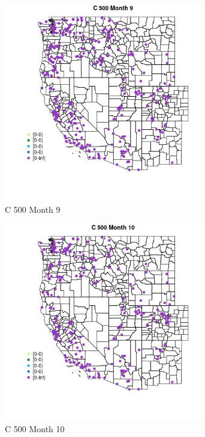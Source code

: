 \begin{figure} 
\centering  
\includegraphics[width=0.77\textwidth]{Code_Outputs/Report_ML_input_PM25_Step4_part_e_de_duplicated_aveswNAs_MapObsMo9C_500.jpg} 
\caption{\label{fig:Report_ML_input_PM25_Step4_part_e_de_duplicated_aveswNAsMapObsMo9C_500}C 500 Month 9} 
\end{figure} 
 

\begin{figure} 
\centering  
\includegraphics[width=0.77\textwidth]{Code_Outputs/Report_ML_input_PM25_Step4_part_e_de_duplicated_aveswNAs_MapObsMo10C_500.jpg} 
\caption{\label{fig:Report_ML_input_PM25_Step4_part_e_de_duplicated_aveswNAsMapObsMo10C_500}C 500 Month 10} 
\end{figure} 
 

